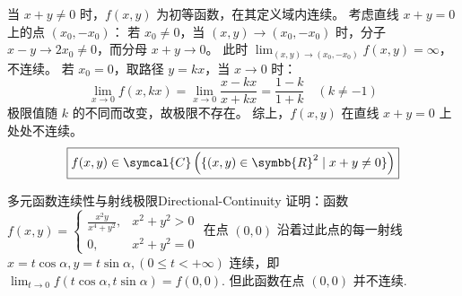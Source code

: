 \begin{solution}

    当 $x + y \neq 0$ 时，$f(x, y)$ 为初等函数，在其定义域内连续。
    考虑直线 $x + y = 0$ 上的点 $(x_0, -x_0)$：
    若 $x_0 \neq 0$，当 $(x, y) \to (x_0, -x_0)$ 时，分子 $x - y \to 2x_0 \neq 0$，而分母 $x + y \to 0$。
    此时 $\lim_{(x, y) \to (x_0, -x_0)} f(x, y) = \infty$，不连续。
    若 $x_0 = 0$，取路径 $y = kx$，当 $x \to 0$ 时：
    \begin{equation}
        \lim_{x \to 0} f(x, kx) = \lim_{x \to 0} \frac{x - kx}{x + kx} = \frac{1 - k}{1 + k} \quad (k \neq -1)
    \end{equation}
    极限值随 $k$ 的不同而改变，故极限不存在。
    综上，$f(x, y)$ 在直线 $x + y = 0$ 上处处不连续。
    \begin{equation}
        \boxed{f(x, y) \in \symcal{C}\left( \{(x, y) \in \symbb{R}^2 \mid x + y \neq 0\} \right)}
    \end{equation}
\end{solution}


\begin{problem}{多元函数连续性与射线极限}{Directional-Continuity}
    证明：函数 $f(x, y) = \begin{cases} \frac{x^2y}{x^4+y^2}, & x^2+y^2 > 0 \\ 0, & x^2+y^2 = 0 \end{cases}$ 在点 $(0,0)$ 沿着过此点的每一射线 $x = t \cos \alpha, y = t \sin \alpha, (0 \le t < +\infty)$ 连续，即 $\lim_{t \to 0} f(t \cos \alpha, t \sin \alpha) = f(0,0)$. 但此函数在点 $(0,0)$ 并不连续.
\end{problem}

